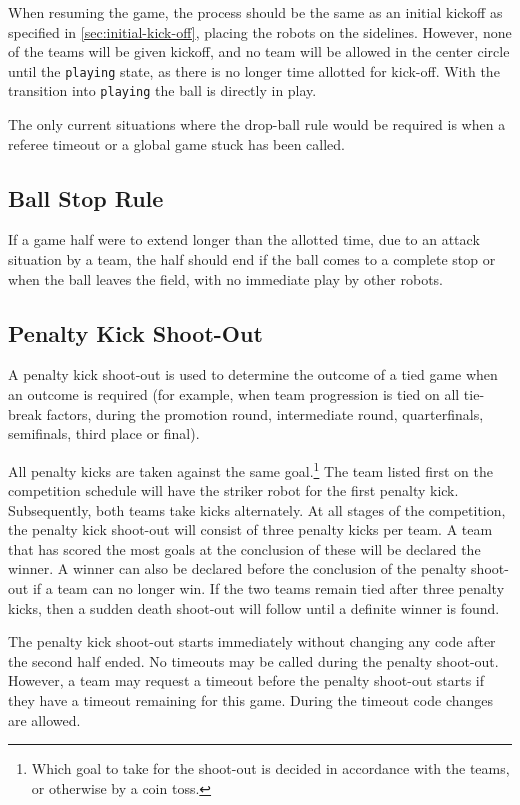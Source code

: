 When resuming the game, the process should be the same as an initial kickoff as specified in \cref{sec:initial-kick-off}, placing the robots on the sidelines.
However, none of the teams will be given kickoff, and no team will be allowed in the center circle until the \texttt{playing} state, as there is no longer time allotted for kick-off. With the transition into \texttt{playing} the ball is directly in play.

The only current situations where the drop-ball rule would be required is when a referee timeout or a global game stuck has been called.

\subsection{Ball Stop Rule}
\label{sec:early_stopping}

If a game half were to extend longer than the allotted time, due to an attack situation by a team, the half should end if the ball comes to a complete stop or when the ball leaves the field, with no immediate play by other robots.

\subsection{Penalty Kick Shoot-Out}
\label{sec:penalty_shoot-out}

A penalty kick shoot-out is used to determine the outcome of a tied game when an outcome is required (for example, when team progression is tied on all tie-break factors, during the promotion round, intermediate round, quarterfinals, semifinals, third place or final).

All penalty kicks are taken against the same goal.\footnote{
  Which goal to take for the shoot-out is decided in accordance with the teams, or otherwise by a coin toss.
}
The team listed first on the competition schedule will have the striker robot for the first penalty kick.
Subsequently, both teams take kicks alternately.
At all stages of the competition, the penalty kick shoot-out will consist of three penalty kicks per team.
A team that has scored the most goals at the conclusion of these will be declared the winner.
A winner can also be declared before the conclusion of the penalty shoot-out if a team can no longer win.
If the two teams remain tied after three penalty kicks, then a sudden death shoot-out will follow until a definite winner is found.

The penalty kick shoot-out starts immediately without changing any code after the second half ended.
No timeouts may be called during the penalty shoot-out.
However, a team may request a timeout before the penalty shoot-out starts if they have a timeout remaining for this game.
During the timeout code changes are allowed.

